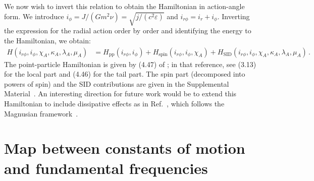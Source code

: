 \documentclass[prd,superscriptaddress,preprintnumbers,tightenlines,nofootinbib, eqsecnum]{revtex4-2}
\begin{document}
We now wish to invert this relation to obtain the Hamiltonian in action-angle form. We introduce 
$i_\phi = J/(G m^2 \nu) =\sqrt{j/(c^2\varepsilon)}$ and $i_{r\phi} = i_r + i_\phi$. Inverting the expression for the radial action order by order and identifying the energy to the Hamiltonian, we obtain:  
\begin{align}\label{eq:Delaunay_Hamiltonian_decomposition_pp_spin_SID}
    H(i_{r\phi},i_\phi,\chi_A,\kappa_A,\lambda_A,\mu_A)&= H_\text{pp}(i_{r\phi},i_\phi)+ H_\text{spin}(i_{r\phi},i_\phi,\chi_A)+H_\text{SID}(i_{r\phi},i_\phi,\chi_A,\kappa_A,\lambda_A,\mu_A)\,.
\end{align}
The point-particle Hamiltonian is given by (4.47) of \cite{Trestini:2025yyc}; in that reference, see (3.13) for the local part and (4.46) for the tail part. The spin part (decomposed into powers of spin) and the SID contributions are given in the Supplemental Material~\cite{Supplemental}. An interesting direction for future work would be to extend this Hamiltonian to include dissipative effects as in Ref.~\cite{Blanco:2026prj}, which follows the Magnusian framework~\cite{Kim:2025gis}. 

\section{Map between constants of motion and fundamental frequencies}
\label{sec:map}
\end{document}
